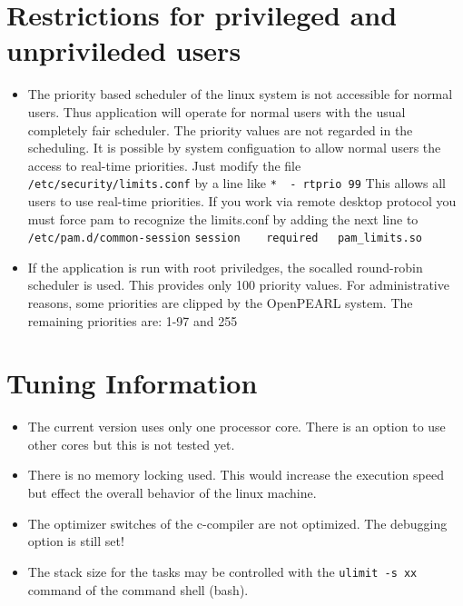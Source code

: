 \documentclass[oneside,10pt]{scrbook}
\begin{document}
\section{Restrictions for privileged and unprivileded users}
\begin{itemize}
\item The priority based scheduler of the linux system is not
   accessible for normal users. Thus application will operate for 
   normal users with
   the usual completely fair scheduler. The priority values are 
   not regarded in the scheduling.
   It is possible by system configuation to allow normal users
   the access to real-time priorities. Just modify the file
   \verb|/etc/security/limits.conf| by a line like\newline
   \verb|*  - rtprio 99|\newline
   This allows all users to use real-time priorities.
   \newline
   If you work via remote desktop protocol you must force pam to
   recognize the limits.conf by adding the next line to \verb|/etc/pam.d/common-session|
   \newline
   \verb|session    required   pam_limits.so|
\item If the application is run with root priviledges, the socalled 
  round-robin scheduler is used. This provides only 100 priority values.
  For administrative reasons, some priorities are clipped by the OpenPEARL
  system.
  The remaining priorities are: 1-97 and 255
\end{itemize}

\section{Tuning Information}
\begin{itemize}
\item The current version uses only one processor core.
     There is an option to use other cores but this is not tested yet.
\item There is no memory locking used.
     This would increase the execution speed but effect the overall
     behavior of the linux machine.
\item The optimizer switches of the c-compiler are not optimized.
   The debugging option is still set!
\item The stack size for the tasks may be controlled with the
   \texttt{ulimit -s xx} command of the command shell (bash).
\end{itemize}
\end{document}
